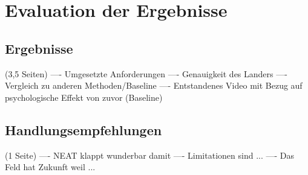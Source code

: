 \chapter{Evaluation der Ergebnisse}
\label{chapter:4}
\section{Ergebnisse}
(3,5 Seiten)
---- Umgesetzte Anforderungen
---- Genauigkeit des Landers
---- Vergleich zu anderen Methoden/Baseline
---- Entstandenes Video mit Bezug auf psychologische Effekt von zuvor (Baseline)

\section{Handlungsempfehlungen}
(1 Seite)
---- NEAT klappt wunderbar damit
---- Limitationen sind ...
---- Das Feld hat Zukunft weil ...